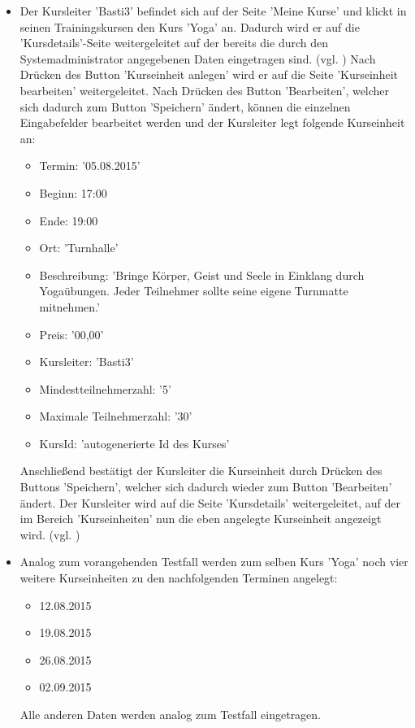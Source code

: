 \documentclass[a4paper]{scrreprt}
\begin{document}
\begin{itemize}
			\item {} 
			Der Kursleiter 'Basti3' befindet sich auf der Seite 'Meine Kurse' und klickt in seinen Trainingskursen den Kurs 'Yoga' an. Dadurch wird er auf die 'Kursdetails'-Seite weitergeleitet auf der bereits die durch den Systemadministrator angegebenen Daten eingetragen sind. (vgl. ) Nach Drücken des Button 'Kurseinheit anlegen' wird er auf die Seite 'Kurseinheit bearbeiten' weitergeleitet. Nach Drücken des Button 'Bearbeiten', welcher sich dadurch zum Button 'Speichern' ändert, können die einzelnen Eingabefelder bearbeitet werden und der Kursleiter legt folgende Kurseinheit an:
			\begin{itemize}
				\item Termin: '05.08.2015'
				\item Beginn: 17:00
				\item Ende: 19:00
				\item Ort: 'Turnhalle'
				\item Beschreibung: 'Bringe Körper, Geist und Seele in Einklang durch Yogaübungen. Jeder Teilnehmer sollte seine eigene Turnmatte mitnehmen.'
				\item Preis: '00,00'
				\item Kursleiter: 'Basti3'
				\item Mindestteilnehmerzahl: '5'
				\item Maximale Teilnehmerzahl: '30'
				\item KursId: 'autogenerierte Id des Kurses'
			\end{itemize}	
			Anschließend bestätigt der Kursleiter die Kurseinheit durch Drücken des Buttons 'Speichern', welcher sich dadurch wieder zum Button 'Bearbeiten' ändert. Der Kursleiter wird auf die Seite 'Kursdetails' weitergeleitet, auf der im Bereich 'Kurseinheiten' nun die eben angelegte Kurseinheit angezeigt wird. (vgl. )
			
			\item {} 
			Analog zum vorangehenden Testfall  werden zum selben Kurs 'Yoga' noch vier weitere Kurseinheiten zu den nachfolgenden Terminen angelegt:
			\begin{itemize}
				\item 12.08.2015
				\item 19.08.2015
				\item 26.08.2015
				\item 02.09.2015
			\end{itemize}		
			Alle anderen Daten werden analog zum Testfall  eingetragen.
			

\end{itemize}
\end{document}
